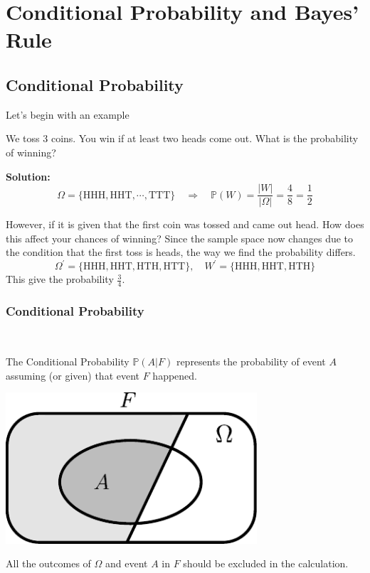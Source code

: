 \chapter{Conditional Probability and Bayes' Rule}

\section{Conditional Probability}

Let's begin with an example

\begin{eg}
We toss 3 coins. You win if at least two heads come out. What is the probability of winning?

\textbf{Solution:} 
\[
    \Omega = \{\text{HHH}, \text{HHT}, \cdots, \text{TTT}\} \quad\Rightarrow\quad \mathbb{P}(W) = \dfrac{\vert W \vert}{\vert \Omega \vert} = \dfrac{4}{8} = \dfrac{1}{2}
\]
\end{eg}

However, if it is given that the first coin was tossed and came out head. How does this affect your chances of winning? Since the sample space now changes due to the condition that the first toss is heads, the way we find the probability differs. 
\[
    \Omega^{\prime} = \{\text{HHH}, \text{HHT}, \text{HTH}, \text{HTT}\},\quad W^{\prime} = \{\text{HHH}, \text{HHT}, \text{HTH}\}
\]
This give the probability \(\frac{3}{4}\). 

\subsection{Conditional Probability}
\begin{definition}~ 

    \begin{minipage}{0.7\textwidth}
        The Conditional Probability \(\mathbb{P}(A|F)\) represents the probability of event \(A\) assuming (or given) that event \(F\) happened.
    \end{minipage}
    \begin{minipage}{0.3\textwidth}
        \centering
        \includegraphics[width=0.7\textwidth]{Figures/ConditionalProbability.pdf}
    \end{minipage}

    \begin{remark}
        All the outcomes of \(\Omega\) and event \(A\) in \(F\) should be excluded in the calculation.
    \end{remark}
\end{definition}

